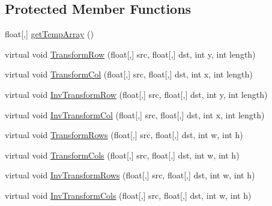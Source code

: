 \subsection*{Protected Member Functions}
\begin{DoxyCompactItemize}
\item 
float\mbox{[},\mbox{]} \hyperlink{class_turbo_wavelets_1_1_wavelet2_d_a3dc6269869eb9c864f615e42d7822153}{get\+Temp\+Array} ()
\item 
virtual void \hyperlink{class_turbo_wavelets_1_1_wavelet2_d_af0339475762d327f9d8ec019079cdc28}{Transform\+Row} (float\mbox{[},\mbox{]} src, float\mbox{[},\mbox{]} dst, int y, int length)
\item 
virtual void \hyperlink{class_turbo_wavelets_1_1_wavelet2_d_a6a6c334fb499d248b72215001ff5e9d4}{Transform\+Col} (float\mbox{[},\mbox{]} src, float\mbox{[},\mbox{]} dst, int x, int length)
\item 
virtual void \hyperlink{class_turbo_wavelets_1_1_wavelet2_d_ac0b65a648f05436b54aa4d925812e1d5}{Inv\+Transform\+Row} (float\mbox{[},\mbox{]} src, float\mbox{[},\mbox{]} dst, int y, int length)
\item 
virtual void \hyperlink{class_turbo_wavelets_1_1_wavelet2_d_a9897e5e3f830ab7ea106e6bcf367fa07}{Inv\+Transform\+Col} (float\mbox{[},\mbox{]} src, float\mbox{[},\mbox{]} dst, int x, int length)
\item 
virtual void \hyperlink{class_turbo_wavelets_1_1_wavelet2_d_a95e430713dc5e27ebf7b254d1346777e}{Transform\+Rows} (float\mbox{[},\mbox{]} src, float\mbox{[},\mbox{]} dst, int w, int h)
\item 
virtual void \hyperlink{class_turbo_wavelets_1_1_wavelet2_d_a7aae90825e937ebb7822c2daa976d22a}{Transform\+Cols} (float\mbox{[},\mbox{]} src, float\mbox{[},\mbox{]} dst, int w, int h)
\item 
virtual void \hyperlink{class_turbo_wavelets_1_1_wavelet2_d_a9109cf50d757e7cda895ce0965134f76}{Inv\+Transform\+Rows} (float\mbox{[},\mbox{]} src, float\mbox{[},\mbox{]} dst, int w, int h)
\item 
virtual void \hyperlink{class_turbo_wavelets_1_1_wavelet2_d_a08ab1e9de65415589726214fa8b45ae2}{Inv\+Transform\+Cols} (float\mbox{[},\mbox{]} src, float\mbox{[},\mbox{]} dst, int w, int h)
\end{DoxyCompactItemize}

